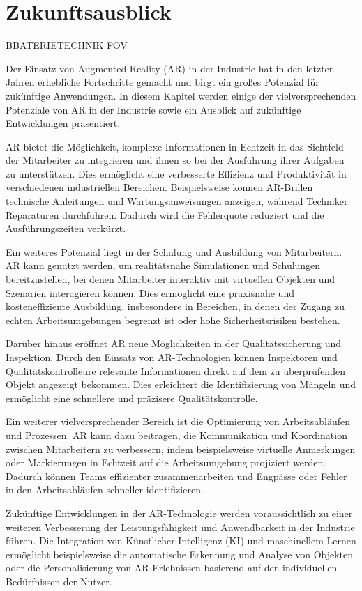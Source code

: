 \section{Zukunftsausblick}
BBATERIETECHNIK FOV

Der Einsatz von Augmented Reality (AR) in der Industrie hat in den letzten
Jahren erhebliche Fortschritte gemacht und birgt ein großes Potenzial für
zukünftige Anwendungen. In diesem Kapitel werden einige der vielversprechenden
Potenziale von AR in der Industrie sowie ein Ausblick auf zukünftige
Entwicklungen präsentiert.

AR bietet die Möglichkeit, komplexe Informationen in Echtzeit in das Sichtfeld
der Mitarbeiter zu integrieren und ihnen so bei der Ausführung ihrer Aufgaben
zu unterstützen. Dies ermöglicht eine verbesserte Effizienz und Produktivität
in verschiedenen industriellen Bereichen. Beispielsweise können AR-Brillen
technische Anleitungen und Wartungsanweisungen anzeigen, während Techniker
Reparaturen durchführen. Dadurch wird die Fehlerquote reduziert und die
Ausführungszeiten verkürzt.

Ein weiteres Potenzial liegt in der Schulung und Ausbildung von Mitarbeitern.
AR kann genutzt werden, um realitätsnahe Simulationen und Schulungen
bereitzustellen, bei denen Mitarbeiter interaktiv mit virtuellen Objekten und
Szenarien interagieren können. Dies ermöglicht eine praxisnahe und
kosteneffiziente Ausbildung, insbesondere in Bereichen, in denen der Zugang zu
echten Arbeitsumgebungen begrenzt ist oder hohe Sicherheitsrisiken bestehen.

Darüber hinaus eröffnet AR neue Möglichkeiten in der Qualitätssicherung und
Inspektion. Durch den Einsatz von AR-Technologien können Inspektoren und
Qualitätskontrolleure relevante Informationen direkt auf dem zu überprüfenden
Objekt angezeigt bekommen. Dies erleichtert die Identifizierung von Mängeln und
ermöglicht eine schnellere und präzisere Qualitätskontrolle.

Ein weiterer vielversprechender Bereich ist die Optimierung von Arbeitsabläufen
und Prozessen. AR kann dazu beitragen, die Kommunikation und Koordination
zwischen Mitarbeitern zu verbessern, indem beispielsweise virtuelle Anmerkungen
oder Markierungen in Echtzeit auf die Arbeitsumgebung projiziert werden.
Dadurch können Teams effizienter zusammenarbeiten und Engpässe oder Fehler in
den Arbeitsabläufen schneller identifizieren.

Zukünftige Entwicklungen in der AR-Technologie werden voraussichtlich zu einer
weiteren Verbesserung der Leistungsfähigkeit und Anwendbarkeit in der Industrie
führen. Die Integration von Künstlicher Intelligenz (KI) und maschinellem
Lernen ermöglicht beispielsweise die automatische Erkennung und Analyse von
Objekten oder die Personalisierung von AR-Erlebnissen basierend auf den
individuellen Bedürfnissen der Nutzer.

